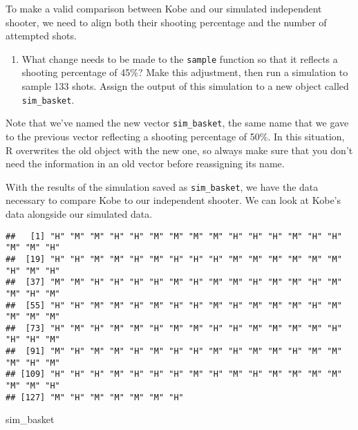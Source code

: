 \documentclass[
]{article}
\newenvironment{Shaded}{\begin{snugshade}}{\end{snugshade}}
\newcommand{\NormalTok}[1]{#1}
\newcommand{\OperatorTok}[1]{\textcolor[rgb]{0.81,0.36,0.00}{\textbf{#1}}}
\providecommand{\tightlist}{%
  \setlength{\itemsep}{0pt}\setlength{\parskip}{0pt}}
\begin{document}
To make a valid comparison between Kobe and our simulated independent
shooter, we need to align both their shooting percentage and the number
of attempted shots.

\begin{enumerate}
\def\labelenumi{\arabic{enumi}.}
\setcounter{enumi}{3}
\tightlist
\item
  What change needs to be made to the \texttt{sample} function so that
  it reflects a shooting percentage of 45\%? Make this adjustment, then
  run a simulation to sample 133 shots. Assign the output of this
  simulation to a new object called \texttt{sim\_basket}.
\end{enumerate}

Note that we've named the new vector \texttt{sim\_basket}, the same name
that we gave to the previous vector reflecting a shooting percentage of
50\%. In this situation, R overwrites the old object with the new one,
so always make sure that you don't need the information in an old vector
before reassigning its name.

With the results of the simulation saved as \texttt{sim\_basket}, we
have the data necessary to compare Kobe to our independent shooter. We
can look at Kobe's data alongside our simulated data.

\begin{Shaded}
\end{Shaded}

\begin{verbatim}
##   [1] "H" "M" "M" "H" "H" "M" "M" "M" "M" "H" "H" "H" "M" "H" "H" "M" "M" "H"
##  [19] "H" "H" "M" "M" "H" "M" "H" "H" "H" "M" "M" "M" "M" "M" "M" "H" "M" "H"
##  [37] "M" "M" "H" "H" "H" "H" "M" "H" "M" "M" "H" "M" "M" "H" "M" "M" "H" "M"
##  [55] "H" "H" "M" "M" "H" "M" "H" "H" "M" "H" "M" "M" "M" "H" "M" "M" "M" "M"
##  [73] "H" "M" "H" "M" "M" "H" "M" "M" "H" "H" "M" "M" "M" "M" "H" "H" "H" "M"
##  [91] "M" "H" "M" "M" "H" "M" "H" "H" "M" "H" "M" "M" "H" "M" "M" "M" "H" "M"
## [109] "H" "H" "H" "M" "H" "H" "H" "M" "H" "M" "H" "M" "M" "M" "M" "M" "M" "H"
## [127] "M" "H" "M" "M" "M" "M" "H"
\end{verbatim}

\begin{Shaded}
\begin{Highlighting}[]
\NormalTok{sim_basket}
\end{Highlighting}
\end{Shaded}
\end{document}

